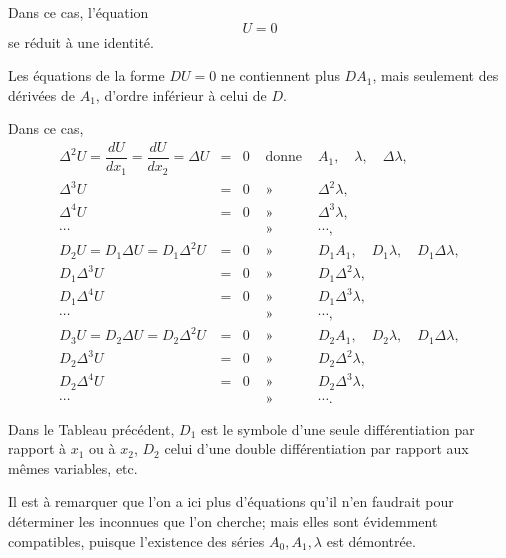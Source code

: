 \documentclass[11pt]{article}
\begin{document}
Dans ce cas, l’équation
\[
U=0
\]
se réduit à une identité.

Les équations de la forme $DU=0$ ne contiennent plus $DA_1$, mais seulement des dérivées de $A_1$, d’ordre inférieur à celui de $D$.

Dans ce cas,
\[
\begin{array}{rclcl}
\Delta^2U=\dfrac{dU}{dx_1}=\dfrac{dU}{dx_2}=\Delta U&=&0&\text{ donne }&A_1,\quad \lambda,\quad \Delta\lambda,\\
\Delta^3U&=&0&\text{ » }&\Delta^2\lambda,\\
\Delta^4U&=&0&\text{ » }&\Delta^3\lambda,\\
\cdots&&&\text{ » }&\cdots,\\
D_2U=D_1\Delta U=D_1\Delta^2U&=&0&\text{ » }&D_1A_1,\quad D_1\lambda,\quad D_1\Delta\lambda,\\
D_1\Delta^3U&=&0&\text{ » }&D_1\Delta^2\lambda,\\
D_1\Delta^4U&=&0&\text{ » }&D_1\Delta^3\lambda,\\
\cdots&&&\text{ » }&\cdots,\\
D_3U=D_2\Delta U=D_2\Delta^2U&=&0&\text{ » }&D_2A_1,\quad D_2\lambda,\quad D_1\Delta\lambda,\\
D_2\Delta^3U&=&0&\text{ » }&D_2\Delta^2\lambda,\\
D_2\Delta^4U&=&0&\text{ » }&D_2\Delta^3\lambda,\\
\cdots&&&\text{ » }&\cdots.
\end{array}
\]

Dans le Tableau précédent, $D_1$ est le symbole d’une seule différentiation par rapport à $x_1$ ou à $x_2$, $D_2$ celui d’une double différentiation par rapport aux mêmes variables, etc.

Il est à remarquer que l’on a ici plus d’équations qu’il n’en faudrait pour déterminer les inconnues que l’on cherche; mais elles sont évidemment compatibles, puisque l’existence des séries $A_0,A_1,\lambda$ est démontrée.
\end{document}
